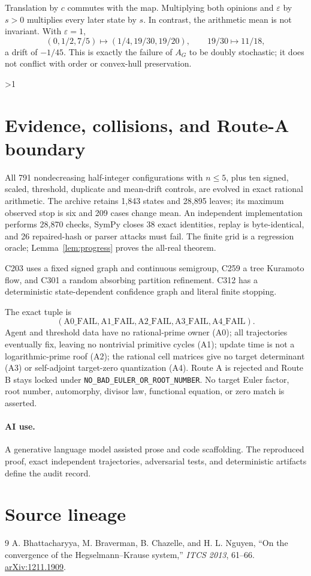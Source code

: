 \documentclass[10pt]{article}
\providecommand{\CRevisionRound}{2}
\begin{document}
Translation by $c$ commutes with the map.  Multiplying both opinions and
$\varepsilon$ by $s>0$ multiplies every later state by $s$.  In contrast,
the arithmetic mean is not invariant.  With $\varepsilon=1$,
\begin{equation}\label{eq:mean}
 (0,1/2,7/5)\longmapsto(1/4,19/30,19/20),
 \qquad 19/30\longmapsto11/18,
\end{equation}
a drift of $-1/45$.  This is exactly the failure of $A_G$ to be doubly
stochastic; it does not conflict with order or convex-hull preservation.
\fi

\ifnum\CRevisionRound>1
\section{Evidence, collisions, and Route-A boundary}
All 791 nondecreasing half-integer configurations with $n\le5$, plus ten
signed, scaled, threshold, duplicate and mean-drift controls, are evolved in
exact rational arithmetic.  The archive retains 1,843 states and 28,895
leaves; its maximum observed stop is six and 209 cases change mean.  An
independent implementation performs 28,870 checks, SymPy closes 38 exact
identities, replay is byte-identical, and 26 repaired-hash or parser attacks
must fail.  The finite grid is a regression oracle; Lemma~\ref{lem:progress}
proves the all-real theorem.

C203 uses a fixed signed graph and continuous semigroup, C259 a tree
Kuramoto flow, and C301 a random absorbing partition refinement.  C312 has a
deterministic state-dependent confidence graph and literal finite stopping.

The exact tuple is
\[
(\mathrm{A0\_FAIL},\mathrm{A1\_FAIL},\mathrm{A2\_FAIL},
 \mathrm{A3\_FAIL},\mathrm{A4\_FAIL}).
\]
Agent and threshold data have no rational-prime owner (A0); all trajectories
eventually fix, leaving no nontrivial primitive cycles (A1); update time is
not a logarithmic-prime roof (A2); the rational cell matrices give no target
determinant (A3) or self-adjoint target-zero quantization (A4).  Route A is
rejected and Route B stays locked under
\texttt{NO\_BAD\_EULER\_OR\_ROOT\_NUMBER}.  No target Euler factor, root
number, automorphy, divisor law, functional equation, or zero match is
asserted.

\paragraph{AI use.} A generative language model assisted prose and code
scaffolding.  The reproduced proof, exact independent trajectories,
adversarial tests, and deterministic artifacts define the audit record.
\fi

\section*{Source lineage}
\begin{thebibliography}{9}
 A. Bhattacharyya, M. Braverman, B. Chazelle, and
H. L. Nguyen, ``On the convergence of the Hegselmann--Krause system,''
\emph{ITCS 2013}, 61--66.  \href{https://arxiv.org/abs/1211.1909}
{arXiv:1211.1909}.
\end{thebibliography}
\end{document}
